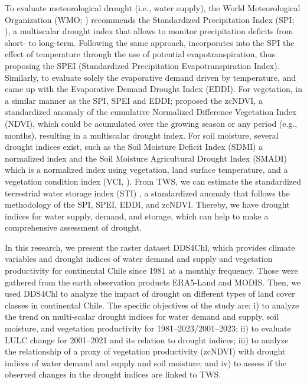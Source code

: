 \documentclass[
  number,
  preprint,
  3p,
  onecolumn]{elsarticle}
\begin{document}
To evaluate meteorological drought (i.e., water supply), the World
Meteorological Organization (WMO; \citep{WMO2012}) recommends the
Standardized Precipitation Index (SPI; \citep{Mckee1993}), a multiscalar
drought index that allows to monitor precipitation deficits from short-
to long-term. Following the same approach, \citep{Vicente-Serrano2010}
incorporates into the SPI the effect of temperature through the use of
potential evapotranspiration, thus proposing the SPEI (Standardized
Precipitation Evapotranspiration Index). Similarly, to evaluate solely
the evaporative demand driven by temperature, \citep{Hobbins2016} and
\citep{McEvoy2016} came up with the Evaporative Demand Drought Index
(EDDI). For vegetation, in a similar manner as the SPI, SPEI and EDDI;
\citep{Zambrano2018} proposed the zcNDVI, a standardized anomaly of the
cumulative Normalized Difference Vegetation Index (NDVI), which could be
acumulated over the growing season or any period (e.g., months),
resulting in a multiscalar drought index. For soil moisture, several
drought indices exist, such as the Soil Moisture Deficit Index (SDMI) a
normalized index \citep{Narasimhan2005} and the Soil Moisture
Agricultural Drought Index (SMADI) \citep{Souza2021} which is a
normalized index using vegetation, land surface temperature, and a
vegetation condition index (VCI, \citep{Kogan1995}). From TWS, we can
estimate the standardized terrestrial water storage index (STI)
\citep{Cui2021}, a standardized anomaly that follows the methodology of
the SPI, SPEI, EDDI, and zcNDVI. Thereby, we have drought indices for
water supply, demand, and storage, which can help to make a
comprehensive assessment of drought.

In this research, we present the raster dataset DDS4Chl, which provides
climate variables and drought indices of water demand and supply and
vegetation productivity for continental Chile since 1981 at a monthly
frequency. Those were gathered from the earth observation products
ERA5-Land and MODIS. Then, we used DDS4Chl to analyze the impact of
drought on different types of land cover classes in continental Chile.
The specific objectives of the study are: i) to analyze the trend on
multi-scalar drought indices for water demand and supply, soil moisture,
and vegetation productivity for 1981--2023/2001--2023; ii) to evaluate
LULC change for 2001--2021 and its relation to drought indices; iii) to
analyze the relationship of a proxy of vegetation productivity (zcNDVI)
with drought indices of water demand and supply and soil moisture; and
iv) to assess if the observed changes in the drought indices are linked
to TWS.
\end{document}
